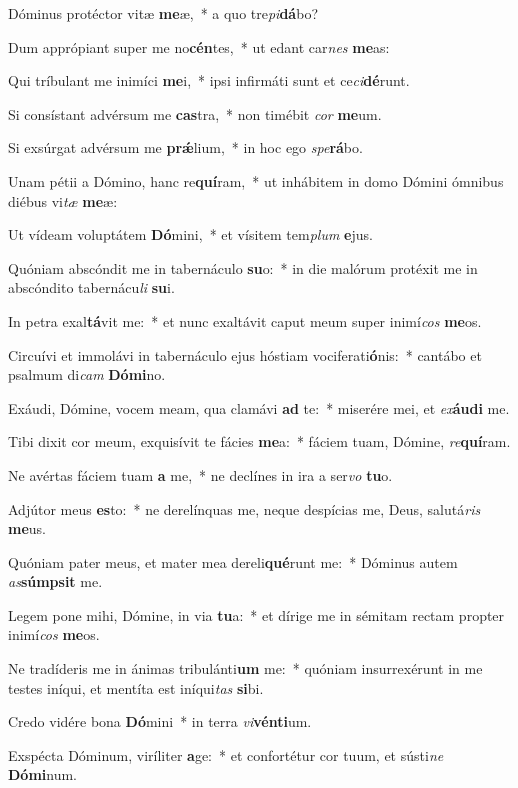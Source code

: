 \item Dóminus protéctor vitæ \textbf{me}æ,~* a quo tre\textit{pi}\textbf{dá}bo?
\item Dum apprópiant super me no\textbf{cén}tes,~* ut edant car\textit{nes} \textbf{me}as:
\item Qui tríbulant me inimíci \textbf{me}i,~* ipsi infirmáti sunt et ce\textit{ci}\textbf{dé}runt.
\item Si consístant advérsum me \textbf{cas}tra,~* non timébit \textit{cor} \textbf{me}um.
\item Si exsúrgat advérsum me \textbf{prǽ}lium,~* in hoc ego \textit{spe}\textbf{rá}bo.
\item Unam pétii a Dómino, hanc re\textbf{quí}ram,~* ut inhábitem in domo Dómini ómnibus diébus vi\textit{tæ} \textbf{me}æ:
\item Ut vídeam voluptátem \textbf{Dó}mini,~* et vísitem tem\textit{plum} \textbf{e}jus.
\item Quóniam abscóndit me in tabernáculo \textbf{su}o:~* in die malórum protéxit me in abscóndito tabernácu\textit{li} \textbf{su}i.
\item In petra exal\textbf{tá}vit me:~* et nunc exaltávit caput meum super inimí\textit{cos} \textbf{me}os.
\item Circuívi et immolávi in tabernáculo ejus hóstiam vociferati\textbf{ó}nis:~* cantábo et psalmum di\textit{cam} \textbf{Dó}\textbf{mi}no.
\item Exáudi, Dómine, vocem meam, qua clamávi \textbf{ad} te:~* miserére mei, et \textit{ex}\textbf{áu}\textbf{di} me.
\item Tibi dixit cor meum, exquisívit te fácies \textbf{me}a:~* fáciem tuam, Dómine, \textit{re}\textbf{quí}ram.
\item Ne avértas fáciem tuam \textbf{a} me,~* ne declínes in ira a ser\textit{vo} \textbf{tu}o.
\item Adjútor meus \textbf{es}to:~* ne derelínquas me, neque despícias me, Deus, salutá\textit{ris} \textbf{me}us.
\item Quóniam pater meus, et mater mea dereli\textbf{qué}runt me:~* Dóminus autem \textit{as}\textbf{súmp}\textbf{sit} me.
\item Legem pone mihi, Dómine, in via \textbf{tu}a:~* et dírige me in sémitam rectam propter inimí\textit{cos} \textbf{me}os.
\item Ne tradíderis me in ánimas tribulánti\textbf{um} me:~* quóniam insurrexérunt in me testes iníqui, et mentíta est iníqui\textit{tas} \textbf{si}bi.
\item Credo vidére bona \textbf{Dó}mini~* in terra \textit{vi}\textbf{vén}\textbf{ti}um.
\item Exspécta Dóminum, viríliter \textbf{a}ge:~* et confortétur cor tuum, et sústi\textit{ne} \textbf{Dó}\textbf{mi}num.
